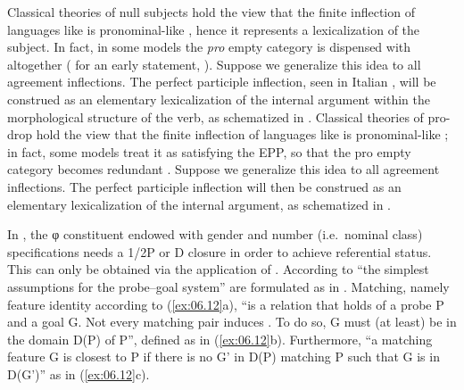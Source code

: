 \documentclass[output=paper]{langsci/langscibook}
\begin{document}
\ea%
    \label{ex:06.10}
\z

Classical theories of null subjects hold the view that the finite inflection of
languages like  is pronominal-like \citep{Rizzi:1982}, hence it represents a
lexicalization of the subject. In fact, in some models the \emph{pro} empty
category is dispensed with altogether (\citealt{Borer1986} for an early
statement, \citealt{ManziniSavoia2005,ManziniSavoia2007}). Suppose we generalize this idea
to all agreement inflections. The perfect participle inflection, seen in
Italian , will be construed as an elementary lexicalization of
the internal argument within the morphological structure of the verb, as
schematized in . Classical theories of pro-drop hold the view
that the finite inflection of languages like  is pronominal-like
\citep{Rizzi:1982}; in fact, some models treat it as satisfying the
\gls{EPP}, so that
the pro empty category becomes redundant \parencite{Borer1986,ManziniSavoia2005,ManziniSavoia2007}. Suppose we generalize this idea to all
agreement inflections. The perfect participle inflection will then be construed
as an elementary lexicalization of the internal argument, as schematized in
.

\ea%
    \label{ex:06.11}
\z

In , the φ constituent endowed with gender and number
(i.e.\ nominal class) specifications needs a 1/2P or D closure in order to
achieve referential status. This can only be obtained via the application of
. According to \citet[122]{Chomsky2000} “the simplest assumptions
for the probe--goal system” are formulated as in . Matching,
namely feature identity according to (\ref{ex:06.12}a), “is a relation that
holds of a probe P and a goal G. Not every matching pair induces .
To do so, G must (at least) be in the domain D(P) of P”, defined as in
(\ref{ex:06.12}b).  Furthermore, “a matching feature G is closest to P if there
is no G' in D(P) matching P such that G is in D(G')” as in (\ref{ex:06.12}c).
\end{document}
